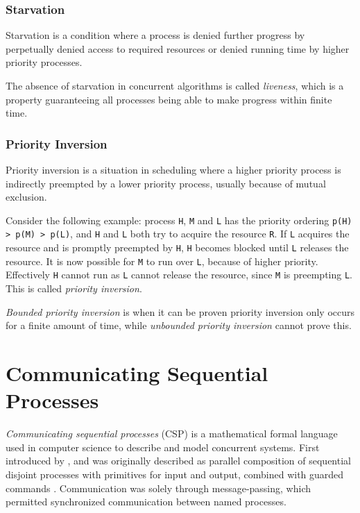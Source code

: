 \subsubsection{Starvation}

Starvation is a condition where a process is denied further progress by perpetually denied access to required resources or denied running time by higher priority processes. 

The absence of starvation in concurrent algorithms is called \textit{liveness}, which is a property guaranteeing all processes being able to make progress within finite time. 


\subsubsection{Priority Inversion}

Priority inversion is a situation in scheduling where a higher priority process is indirectly preempted by a lower priority process, usually because of mutual exclusion. 

Consider the following example: process \texttt{H}, \texttt{M} and \texttt{L} has the priority ordering \texttt{p(H) > p(M) > p(L)}, and \texttt{H} and \texttt{L} both try to acquire the resource \texttt{R}. If \texttt{L} acquires the resource and is promptly preempted by \texttt{H}, \texttt{H} becomes blocked until \texttt{L} releases the resource. It is now possible for \texttt{M} to run over \texttt{L}, because of higher priority. Effectively \texttt{H} cannot run as \texttt{L} cannot release the resource, since \texttt{M} is preempting \texttt{L}. This is called \textit{priority inversion}.

\textit{Bounded priority inversion} is when it can be proven priority inversion only occurs for a finite amount of time, while \textit{unbounded priority inversion} cannot prove this. 



\section{Communicating Sequential Processes}
\label{sec:csp}

\textit{Communicating sequential processes} (CSP) is a mathematical formal language used in computer science to describe and model concurrent systems. First introduced by \citet{hoare1978communicating}, and was originally described as parallel composition of sequential disjoint processes with primitives for input and output, combined with guarded commands \citep{dijkstra1975guarded}. Communication was solely through message\hyp{}passing, which permitted synchronized communication between named processes.

